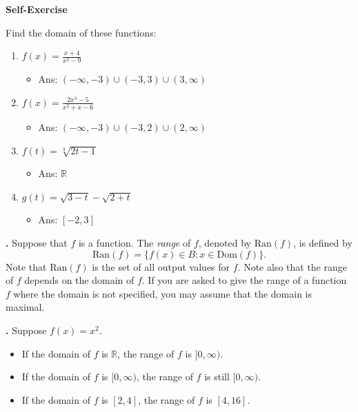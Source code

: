 \documentclass[t]{beamer}
\theoremstyle{plain}
\theoremstyle{definition}
\newcounter{heading}
\newcommand{\makeheading}[1]{\medskip\begin{large}\noindent\textbf{{#1}}\end{large}\smallskip}
\newcommand{\newhead}[1]{\medskip\stepcounter{heading}\noindent\textbf{\hspace{0.2cm}{#1}.}}
\newcommand{\RR}{\mathbb{R}}
\newcommand{\Dom}{\mathrm{Dom}}
\newcommand{\Range}{\mathrm{Ran}}
\begin{document}
\begin{frame}
\makeheading{Self-Exercise}

Find the domain of these functions:
\begin{enumerate}
\item $f(x) = \frac{x+4}{x^2 - 9}$ 
\begin{itemize}
	\item Ans: $(-\infty, -3) \cup (-3, 3) \cup (3, \infty)$
\end{itemize}

\item $f(x) = \frac{2x^3 - 5}{x^2 + x - 6}$ 
\begin{itemize}
	\item Ans: $(-\infty, -3) \cup (-3, 2) \cup (2, \infty)$
\end{itemize}

\item $f(t) = \sqrt[3]{2t-1}$ 
 \begin{itemize}
	\item Ans: $\RR$
\end{itemize}

\item  $g(t) = \sqrt{3 - t} - \sqrt{2 + t}$ 
\begin{itemize}
	\item Ans: $[-2, 3]$
\end{itemize}
\end{enumerate}

\end{frame}

\begin{frame}
\newhead{The range of a function} Suppose that $f$ is a function. The \textit{range} of $f$, denoted by $\Range(f)$, is defined by
\[\Range(f)=\{f(x)\in B:x\in\Dom(f)\}.\]
\noindent Note that $\Range(f)$ is the set of all output values for $f$.  Note also that the range of $f$ depends on the domain of $f$.  If you are asked to give the range of a function $f$ where the domain is not specified, you may assume that the domain is maximal.

\newhead{Example} Suppose $f(x) = x^{2}$.
\begin{itemize}
\item If the domain of $f$ is $\mathbb{R}$, the range of $f$ is $[0, \infty)$.
\item If the domain of $f$ is $[0,\infty)$, the range of $f$ is still $[0, \infty)$.
\item If the domain of $f$ is $[2, 4]$, the range of $f$ is $[4, 16]$.
\end{itemize}
\end{frame}
\end{document}
